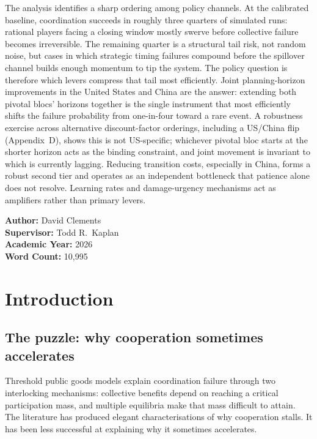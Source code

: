 \documentclass[10pt,a4paper]{article}
\begin{document}
\begin{titlepage}
The analysis identifies a sharp ordering among policy channels. At the calibrated baseline, coordination succeeds in roughly three quarters of simulated runs: rational players facing a closing window mostly swerve before collective failure becomes irreversible. The remaining quarter is a structural tail risk, not random noise, but cases in which strategic timing failures compound before the spillover channel builds enough momentum to tip the system. The policy question is therefore which levers compress that tail most efficiently. Joint planning-horizon improvements in the United States and China are the answer: extending both pivotal blocs' horizons together is the single instrument that most efficiently shifts the failure probability from one-in-four toward a rare event. A robustness exercise across alternative discount-factor orderings, including a US/China flip (Appendix~D), shows this is not US-specific; whichever pivotal bloc starts at the shorter horizon acts as the binding constraint, and joint movement is invariant to which is currently lagging. Reducing transition costs, especially in China, forms a robust second tier and operates as an independent bottleneck that patience alone does not resolve. Learning rates and damage-urgency mechanisms act as amplifiers rather than primary levers.

\vfill
\noindent\textbf{Author:} David Clements\\
\textbf{Supervisor:} Todd R.\ Kaplan\\
\textbf{Academic Year:} 2026\\
\textbf{Word Count:} 10,995
\end{titlepage}

\clearpage
\tableofcontents
\clearpage

\clearpage
\needspace{12em}
\section{Introduction}

\subsection*{The puzzle: why cooperation sometimes accelerates}

Threshold public goods models explain coordination failure through two interlocking mechanisms:
collective benefits depend on reaching a critical participation mass, and multiple equilibria make that
mass difficult to attain. The literature has produced elegant characterisations of why cooperation stalls. It
has been less successful at explaining why it sometimes accelerates.
\end{document}
